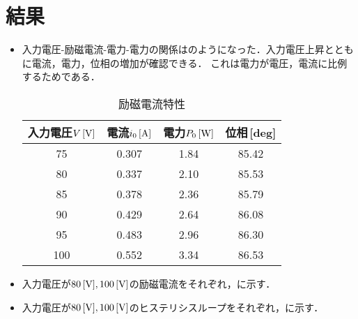 \clearpage

\section{結果}
\begin{itemize}
	\item 入力電圧-励磁電流-電力-電力の関係はのようになった．入力電圧上昇とともに電流，電力，位相の増加が確認できる．
	これは電力が電圧，電流に比例するためである．
	\begin{table}[h]
	\centering
	\caption{励磁電流特性}
	\label{tab:re1}
	\begin{tabular}{cccc}
	\hline
	入力電圧$V\,[\rm{V}]$& 電流$i_{0}\,[\rm{A}]$& 電力$P_{0}\,[\rm{W}]$& 位相\,[\rm{deg}]  \\ 
	\hline
	75  & 0.307    & 1.84     & 85.42 \\
	80  & 0.337    & 2.10      & 85.53 \\
	85  & 0.378    & 2.36     & 85.79 \\
	90  & 0.429    & 2.64     & 86.08 \\
	95  & 0.483    & 2.96     & 86.30 \\
	100 & 0.552    & 3.34     & 86.53 \\ \hline
	\end{tabular}
	\end{table}
	\item 入力電圧が$80\,[\rm{V}], 100\,[\rm{V}]$の励磁電流をそれぞれ\wfig{}，\wfig{}に示す．
	\item 入力電圧が$80\,[\rm{V}], 100\,[\rm{V}]$のヒステリシスループをそれぞれ\wfig{}，\wfig {}に示す．
\end{itemize}